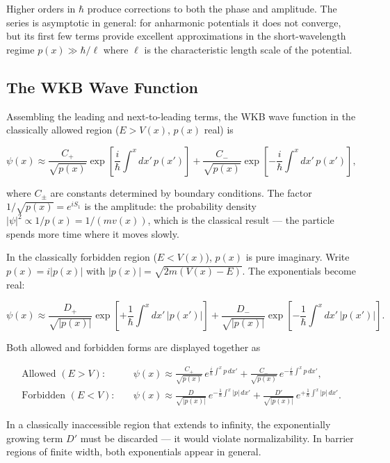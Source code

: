 Higher orders in $\hbar$ produce corrections to both the phase and amplitude. The series is asymptotic in general: for anharmonic potentials it does not converge, but its first few terms provide excellent approximations in the short-wavelength regime $p(x) \gg \hbar/\ell$ where $\ell$ is the characteristic length scale of the potential.

\subsection{The WKB Wave Function}

Assembling the leading and next-to-leading terms, the WKB wave function in the classically allowed region ($E > V(x)$, $p(x)$ real) is
\begin{linenomath}
\begin{equation*}
\psi(x) \approx \frac{C_+}{\sqrt{p(x)}}\exp\left[\frac{i}{\hbar}\int^x dx'\,p(x')\right] + \frac{C_-}{\sqrt{p(x)}}\exp\left[-\frac{i}{\hbar}\int^x dx'\,p(x')\right],
\end{equation*}
\end{linenomath}
where $C_\pm$ are constants determined by boundary conditions. The factor $1/\sqrt{p(x)} = e^{iS_1}$ is the amplitude: the probability density $|\psi|^2 \propto 1/p(x) = 1/(m v(x))$, which is the classical result --- the particle spends more time where it moves slowly.

In the classically forbidden region ($E < V(x)$), $p(x)$ is pure imaginary. Write $p(x) = i|p(x)|$ with $|p(x)| = \sqrt{2m(V(x)-E)}$. The exponentials become real:
\begin{linenomath}
\begin{equation*}
\psi(x) \approx \frac{D_+}{\sqrt{|p(x)|}}\exp\left[+\frac{1}{\hbar}\int^x dx'\,|p(x')|\right] + \frac{D_-}{\sqrt{|p(x)|}}\exp\left[-\frac{1}{\hbar}\int^x dx'\,|p(x')|\right].
\end{equation*}
\end{linenomath}
Both allowed and forbidden forms are displayed together as
\begin{linenomath}
\begin{equation}
\boxed{\begin{aligned}
\text{Allowed }(E>V):\quad &\psi(x) \approx \frac{C_+}{\sqrt{p(x)}}\,e^{\frac{i}{\hbar}\int^x p\,dx'} + \frac{C_-}{\sqrt{p(x)}}\,e^{-\frac{i}{\hbar}\int^x p\,dx'},\\[6pt]
\text{Forbidden }(E<V):\quad &\psi(x) \approx \frac{D}{\sqrt{|p(x)|}}\,e^{-\frac{1}{\hbar}\int^x |p|\,dx'} + \frac{D'}{\sqrt{|p(x)|}}\,e^{+\frac{1}{\hbar}\int^x |p|\,dx'}.
\end{aligned}}
\label{eq:wkb-wavefunction}
\end{equation}
\end{linenomath}
In a classically inaccessible region that extends to infinity, the exponentially growing term $D'$ must be discarded --- it would violate normalizability. In barrier regions of finite width, both exponentials appear in general.

